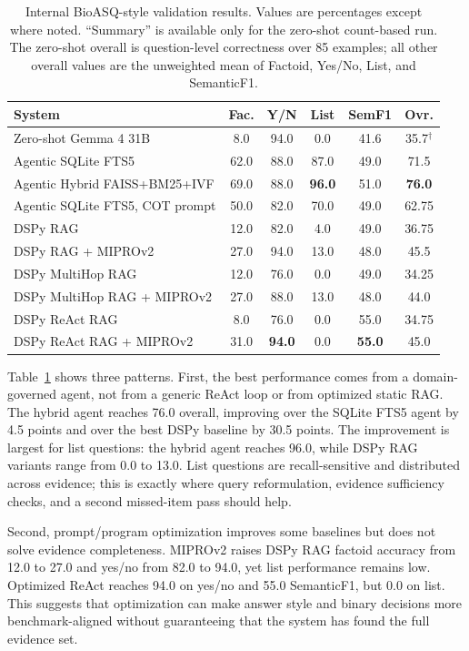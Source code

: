 \documentclass[sigconf,nonacm]{acmart}
\begin{document}
\begin{table}[t]
\caption{Internal BioASQ-style validation results. Values are percentages except where noted. ``Summary'' is available only for the zero-shot count-based run. The zero-shot overall is question-level correctness over 85 examples; all other overall values are the unweighted mean of Factoid, Yes/No, List, and SemanticF1.}
\label{tab:results}
\small
\begin{tabular}{lccccc}
\toprule
\textbf{System} & \textbf{Fac.} & \textbf{Y/N} & \textbf{List} & \textbf{SemF1} & \textbf{Ovr.} \\
\midrule
Zero-shot Gemma 4 31B & 8.0 & 94.0 & 0.0 & 41.6 & 35.7$^\dagger$ \\
\midrule
Agentic SQLite FTS5 & 62.0 & 88.0 & 87.0 & 49.0 & 71.5 \\
Agentic Hybrid FAISS+BM25+IVF & 69.0 & 88.0 & \textbf{96.0} & 51.0 & \textbf{76.0} \\
Agentic SQLite FTS5, COT prompt & 50.0 & 82.0 & 70.0 & 49.0 & 62.75 \\
\midrule
DSPy RAG & 12.0 & 82.0 & 4.0 & 49.0 & 36.75 \\
DSPy RAG + MIPROv2 & 27.0 & 94.0 & 13.0 & 48.0 & 45.5 \\
DSPy MultiHop RAG & 12.0 & 76.0 & 0.0 & 49.0 & 34.25 \\
DSPy MultiHop RAG + MIPROv2 & 27.0 & 88.0 & 13.0 & 48.0 & 44.0 \\
DSPy ReAct RAG & 8.0 & 76.0 & 0.0 & 55.0 & 34.75 \\
DSPy ReAct RAG + MIPROv2 & 31.0 & \textbf{94.0} & 0.0 & \textbf{55.0} & 45.0 \\
\bottomrule
\end{tabular}
\vspace{-2mm}
\end{table}

Table~\ref{tab:results} shows three patterns. First, the best performance comes from a domain-governed agent, not from a generic ReAct loop or from optimized static RAG. The hybrid agent reaches 76.0 overall, improving over the SQLite FTS5 agent by 4.5 points and over the best DSPy baseline by 30.5 points. The improvement is largest for list questions: the hybrid agent reaches 96.0, while DSPy RAG variants range from 0.0 to 13.0. List questions are recall-sensitive and distributed across evidence; this is exactly where query reformulation, evidence sufficiency checks, and a second missed-item pass should help.

Second, prompt/program optimization improves some baselines but does not solve evidence completeness. MIPROv2 raises DSPy RAG factoid accuracy from 12.0 to 27.0 and yes/no from 82.0 to 94.0, yet list performance remains low. Optimized ReAct reaches 94.0 on yes/no and 55.0 SemanticF1, but 0.0 on list. This suggests that optimization can make answer style and binary decisions more benchmark-aligned without guaranteeing that the system has found the full evidence set.
\end{document}
